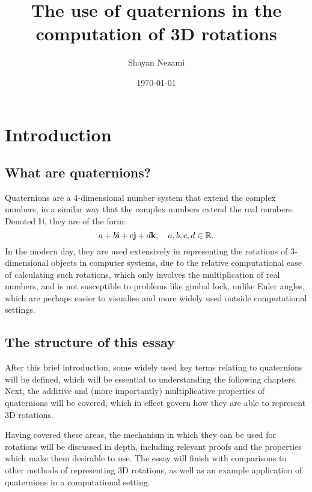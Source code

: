 \documentclass[11pt]{article}
\title{The use of quaternions in the computation of 3D rotations}
\author{Shayan Nezami}
\date{\today}
\begin{document}
\maketitle	
\pagebreak

\tableofcontents
\pagebreak

\section{Introduction}

\subsection{What are quaternions?}

Quaternions are a 4-dimensional number system that extend the complex numbers, in a similar way that the complex numbers extend the real numbers. Denoted $\mathbb{H}$, they are of the form:
\begin{equation}
    a + b\vb{i} + c\vb{j} + d\vb{k}, \quad a, b, c, d \in \mathbb{R}.
\end{equation}
In the modern day, they are used extensively in representing the rotations of 3-dimensional objects in computer systems, due to the relative computational ease of calculating such rotations, which only involves the multiplication of real numbers, and is not susceptible to problems like gimbal lock, unlike Euler angles, which are perhaps easier to visualise and more widely used outside computational settings. \cite{QuaternionWiki}

\subsection{The structure of this essay}

After this brief introduction, some widely used key terms relating to quaternions will be defined, which will be essential to understanding the following chapters. Next, the additive and (more importantly) multiplicative properties of quaternions will be covered, which in effect govern how they are able to represent 3D rotations.

Having covered these areas, the mechanism in which they can be used for rotations will be discussed in depth, including relevant proofs and the properties which make them desirable to use. The essay will finish with comparisons to other methods of representing 3D rotations, as well as an example application of quaternions in a computational setting.
\end{document}
